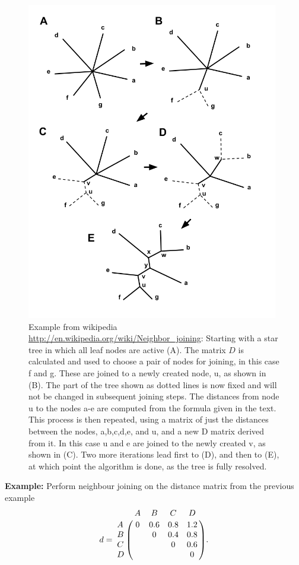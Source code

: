\documentclass[11pt]{article}
\begin{document}
\begin{figure}[hbtp]
\includegraphics[width=11cm]{figures/nj}
\caption{ Example from wikipedia \url{http://en.wikipedia.org/wiki/Neighbor_joining}: Starting with a star tree in which all leaf nodes are active (A).  The matrix $D$ is calculated and used to choose a pair of nodes for joining, in this case f and g. These are joined to a newly created node, u, as shown in (B). The part of the tree shown as dotted lines is now fixed and will not be changed in subsequent joining steps. The distances from node u to the nodes a-e are computed from the formula given in the text. This process is then repeated, using a matrix of just the distances between the nodes, a,b,c,d,e, and u, and a new D matrix derived from it. In this case u and e are joined to the newly created v, as shown in (C). Two more iterations lead first to (D), and then to (E), at which point the algorithm is done, as the tree is fully resolved.}
\label{fig:nj}
\end{figure}


{\bf Example:}  Perform neighbour joining on the distance matrix from the previous example  
\[ d = \bordermatrix{~ & A & B & C & D \cr
              A & 0 & 0.6 & 0.8 & 1.2 \cr
              B &  & 0 & 0.4 & 0.8 \cr
              C &  &  & 0 & 0.6 \cr
              D &  &  &  & 0 \cr}.
\]
\end{document}
